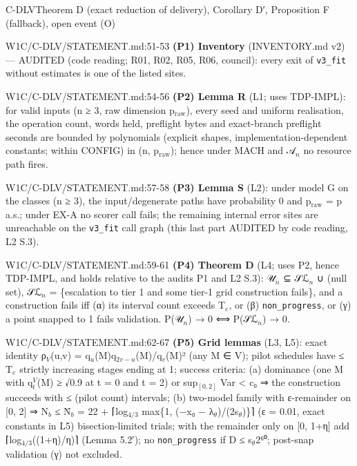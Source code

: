 \begin{card}{C-DLV}{Theorem D (exact reduction of delivery), Corollary D′, Proposition F (fallback), open event (O)}
\begin{stmt}{W1C/C-DLV/STATEMENT.md:51-53}
\textbf{(P1) Inventory} (INVENTORY.md v2) — AUDITED (code reading; R01, R02, R05, R06, council): every exit of \texttt{v3\_fit}
without estimates is one of the listed sites.
\end{stmt}
\begin{stmt}{W1C/C-DLV/STATEMENT.md:54-56}
\textbf{(P2) Lemma R} (L1; uses TDP-IMPL): for valid inputs (n ≥ 3, raw dimension p$_{\mathrm{raw}}$), every seed and uniform realisation, the
operation count, words held, preflight bytes and exact-branch preflight seconds are bounded by polynomials (explicit shapes, implementation-dependent constants; within CONFIG) in
(n, p$_{\mathrm{raw}}$); hence under MACH and 𝒜$_{n}$ no resource path fires.
\end{stmt}
\begin{stmt}{W1C/C-DLV/STATEMENT.md:57-58}
\textbf{(P3) Lemma S} (L2): under model G on the classes (n ≥ 3), the input/degenerate paths have probability 0 and p$_{\mathrm{raw}}$ = p
a.s.; under EX-A no scorer call fails; the remaining internal error sites are unreachable on the \texttt{v3\_fit} call graph (this last part AUDITED by code reading, L2 S.3).
\end{stmt}
\begin{stmt}{W1C/C-DLV/STATEMENT.md:59-61}
\textbf{(P4) Theorem D} (L4; uses P2, hence TDP-IMPL, and holds relative to the audits P1 and L2 S.3): 𝒰$_{n}$ ⊆ 𝒮ℒ$_{n}$ ∪ (null set), 𝒮ℒ$_{n}$ = \{escalation to tier 1 and some tier-1 grid construction
fails\}, and a construction fails iff (α) its interval count exceeds T$_{e}$, or (β) \texttt{non\_progress}, or (γ) a point snapped
to 1 fails validation. P(𝒰$_{n}$) → 0 ⟺ P(𝒮ℒ$_{n}$) → 0.
\end{stmt}
\begin{stmt}{W1C/C-DLV/STATEMENT.md:62-67}
\textbf{(P5) Grid lemmas} (L3, L5): exact identity ρ$_{V}$(u,v) = q$_{u}$(M)q$_{2v-u}$(M)/q$_{v}$(M)² (any M ∈ V); pilot schedules have
≤ T$_{e}$ strictly increasing stages ending at 1; success criteria: (a) dominance (one M with q$_{t}^{V}$(M) ≥ √0.9 at t = 0
and t = 2) or sup$_{[0,2]}$ Var < c₀ ⇒ the construction succeeds with ≤ (pilot count) intervals; (b) two-model family with
ε-remainder on [0, 2] ⇒ N$_{b}$ ≤ N̄$_{b}$ = 22 + ⌈log$_{4/3}$ max\{1, (−x₀ − λ$_{\theta}$)/(2s$_{\theta}$)\}⌉ (ε = 0.01, exact constants in L5)
bisection-limited trials; with the remainder only on [0, 1+η] add ⌈log$_{4/3}$((1+η)/η)⌉ (Lemma 5.2′); no
\texttt{non\_progress} if D ≤ s$_{\theta}$2⁶⁰; post-snap validation (γ) not excluded.

\end{stmt}
\end{card}
